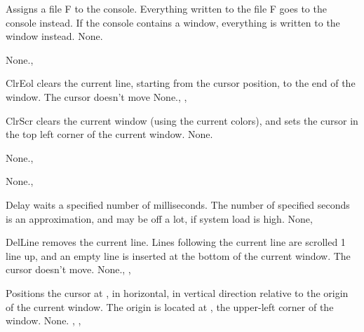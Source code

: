 {
Assigns a file F to the console. Everything written to the file F goes to
the console instead. If the console contains a window, everything is written
to the window instead.
}
{None.}{}



{None.}{, }

{ ClrEol clears the current line, starting from the cursor position, to the
end of the window. The cursor doesn't move}
{None.}{, , }



{ ClrScr clears the current window (using the current colors), 
and sets the cursor in the top left
corner of the current window.}
{None.}{  }



{None.}{, }

{None.}{, }

{Delay waits a specified number of milliseconds. The number of specified
seconds is an approximation, and may be off a lot, if system load is high.}
{None}{, }



{ DelLine removes the current line. Lines following the current line are 
scrolled 1 line up, and an empty line is inserted at the bottom of the
current window. The cursor doesn't move.}
{None.}{, , }



{ Positions the cursor at ,  in horizontal,  in
vertical direction relative to the origin of the current window. The origin
is located at , the upper-left corner of the window.
}
{None.}{ , ,  }

